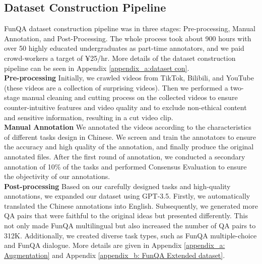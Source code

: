 \subsection{Dataset Construction Pipeline} 
\label{Section: dataset construction pipeline}
FunQA dataset construction pipeline was in three stages: Pre-processing, Manual Annotation, and Post-Processing. The whole process took about 900 hours with over 50 highly educated undergraduates as part-time annotators, and we paid crowd-workers a target of ¥25/hr. More details of the dataset construction pipeline can be seen in Appendix \ref{appendix_a:dataset con}.\\
\noindent\textbf{Pre-processing}\quad
Initially, we crawled videos from TikTok, Bilibili, and YouTube (these videos are a collection of surprising videos). Then we performed a two-stage manual cleaning and cutting process on the collected videos to ensure counter-intuitive features and video quality and to exclude non-ethical content and sensitive information, resulting in a cut video clip.\\
\noindent\textbf{Manual Annotation}\quad
We annotated the videos according to the characteristics of different tasks design in Chinese. We screen and train the annotators to ensure the accuracy and high quality of the annotation, and finally produce the original annotated files. After the first round of annotation, we conducted a secondary annotation of 10\% of the tasks and performed Consensus Evaluation to ensure the objectivity of our annotations.\\
\noindent\textbf{Post-processing}\quad 
Based on our carefully designed tasks and high-quality annotations, we expanded our dataset using GPT-3.5. Firstly, we automatically translated the Chinese annotations into English. Subsequently, we generated more QA pairs that were faithful to the original ideas but presented differently. This not only made FunQA multilingual but also increased the number of QA pairs to 312K. Additionally, we created diverse task types, such as FunQA multiple-choice and FunQA dialogue. More details are given in Appendix \ref{appendix_a: Augmentation} and Appendix \ref{appendix_b: FunQA Extended dataset}.


% 


